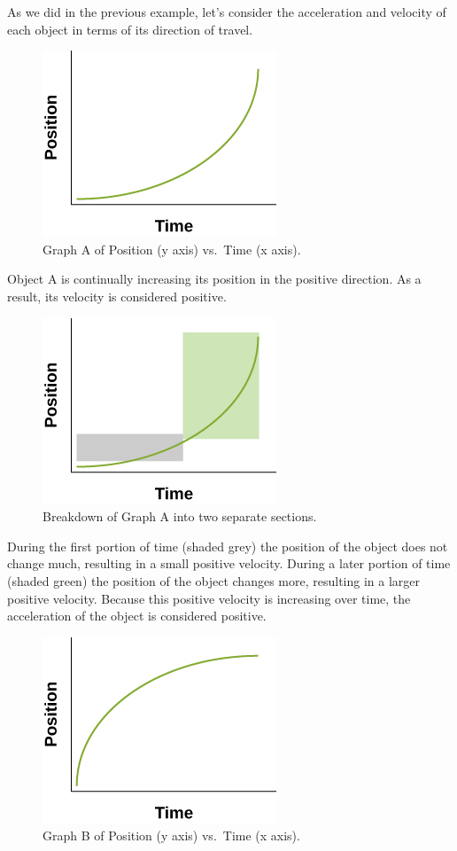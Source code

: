 \documentclass[
]{book}
\begin{document}
As we did in the previous example, let's consider the acceleration and
velocity of each object in terms of its direction of travel.

\begin{figure}
\hypertarget{fs-id2217910}{%
\centering
\includegraphics{images/Figure_Ch2_M4_08.jpg}
\caption{Graph A of Position (y axis) vs.~Time (x
axis).}\label{fs-id2217910}
}
\end{figure}

Object A is continually increasing its position in the positive
direction. As a result, its velocity is considered positive.

\begin{figure}
\hypertarget{fs-id1850704}{%
\centering
\includegraphics{images/Figure_Ch2_M4_09.jpg}
\caption{Breakdown of Graph A into two separate
sections.}\label{fs-id1850704}
}
\end{figure}

During the first portion of time (shaded grey) the position of the
object does not change much, resulting in a small positive velocity.
During a later portion of time (shaded green) the position of the object
changes more, resulting in a larger positive velocity. Because this
positive velocity is increasing over time, the acceleration of the
object is considered positive.

\begin{figure}
\hypertarget{fs-id3207940}{%
\centering
\includegraphics{images/Figure_Ch2_M4_10.jpg}
\caption{Graph B of Position (y axis) vs.~Time (x
axis).}\label{fs-id3207940}
}
\end{figure}
\end{document}
